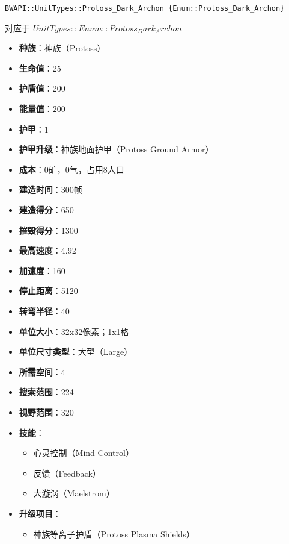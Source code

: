 \begin{tcolorbox}[colback=white, colframe=black!60!white, title=Protoss\_Dark\_Archon(), arc=0mm]
    \begin{verbatim}
BWAPI::UnitTypes::Protoss_Dark_Archon {Enum::Protoss_Dark_Archon}
    \end{verbatim}
    对应于  $ UnitTypes::Enum::Protoss_Dark_Archon $ 
    \begin{itemize}
        \item \textbf{种族}：神族（Protoss）
        \item \textbf{生命值}：25
        \item \textbf{护盾值}：200
        \item \textbf{能量值}：200
        \item \textbf{护甲}：1
        \item \textbf{护甲升级}：神族地面护甲（Protoss Ground Armor）
        \item \textbf{成本}：0矿，0气，占用8人口
        \item \textbf{建造时间}：300帧
        \item \textbf{建造得分}：650
        \item \textbf{摧毁得分}：1300
        \item \textbf{最高速度}：4.92
        \item \textbf{加速度}：160
        \item \textbf{停止距离}：5120
        \item \textbf{转弯半径}：40
        \item \textbf{单位大小}：32x32像素；1x1格
        \item \textbf{单位尺寸类型}：大型（Large）
        \item \textbf{所需空间}：4
        \item \textbf{搜索范围}：224
        \item \textbf{视野范围}：320
        \item \textbf{技能}：
            \begin{itemize}
                \item 心灵控制（Mind Control）
                \item 反馈（Feedback）
                \item 大漩涡（Maelstrom）
            \end{itemize}
        \item \textbf{升级项目}：
            \begin{itemize}
                \item 神族等离子护盾（Protoss Plasma Shields）

\end{itemize}
\end{itemize}
\end{tcolorbox}
